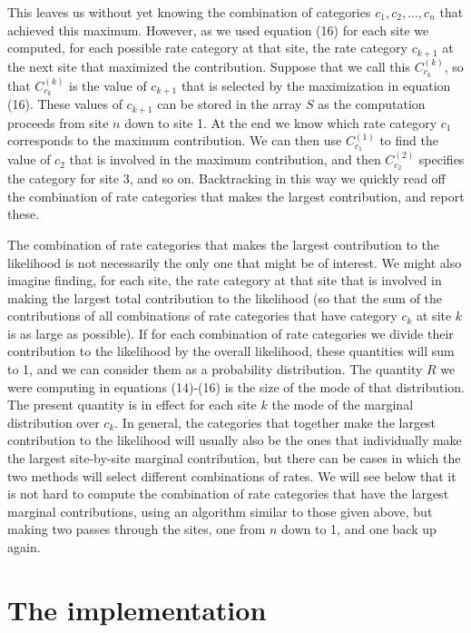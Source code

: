 \documentclass[12pt]{article}
\begin{document}
This leaves us without yet knowing the combination of categories
$c_1, c_2, ..., c_n$ that achieved this maximum.  However, as we used equation
(16) for each site we computed, for each possible rate category at that site,
the rate category $c_{k+1}$ at the next site that maximized the contribution.  Suppose
that we call this $C_{c_k}^{(k)}$, so that $C_{c_k}^{(k)}$ is the value of $c_{k+1}$
that is selected by the maximization in equation (16).  These values of
$c_{k+1}$ can be stored in the array $S$ as the computation proceeds from
site $n$ down to site 1.  At the end we know which rate category $c_1$
corresponds to the maximum contribution.  We can then use $C_{c_1}^{(1)}$
to find the value of $c_2$ that is involved in the maximum contribution, and
then $C_{c_2}^{(2)}$ specifies the category for site 3, and so on.
Backtracking in this way we quickly read off the combination of rate
categories that makes the largest contribution, and report these.

The combination of rate categories that makes the largest contribution to the
likelihood is not necessarily the only one that might be of interest.  We might
also imagine finding, for each site, the rate category at that site that
is involved in making the largest total contribution to the likelihood (so that
the sum of the contributions of all combinations of rate categories that have
category $c_k$ at site $k$ is as large as possible).  If for each combination
of rate categories we divide their contribution to the likelihood by the
overall likelihood, these quantities will sum to 1, and we can consider them
as a probability distribution.  The quantity $R$ we were computing
in equations (14)-(16)
is the size of the mode of that distribution.  The present quantity is in effect
for each site $k$ the mode of the marginal distribution
over $c_k$.  In general, the categories
that together make the largest contribution to the likelihood will usually also
be the ones that individually make the largest site-by-site marginal contribution, but
there can be cases in which the two methods will select different combinations
of rates.  We will see below that it is not hard to compute the combination of rate categories
that have the largest marginal contributions, using an algorithm similar to
those given above, but making two passes through the sites, one from $n$ down
to 1, and one back up again.

\section*{The implementation}
 
\end{document}
